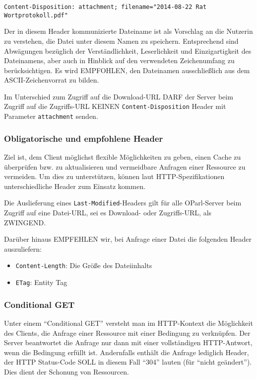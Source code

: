 \documentclass[,a4paper]{article}
\begin{document}
\begin{verbatim}
Content-Disposition: attachment; filename="2014-08-22 Rat Wortprotokoll.pdf"
\end{verbatim}

Der in diesem Header kommunizierte Dateiname ist als Vorschlag an die
Nutzerin zu verstehen, die Datei unter diesem Namen zu speichern.
Entsprechend sind Abwägungen bezüglich der Verständlichkeit,
Leserlichkeit und Einzigartigkeit des Dateinamens, aber auch in Hinblick
auf den verwendeten Zeichenumfang zu berücksichtigen. Es wird EMPFOHLEN,
den Dateinamen ausschließlich aus dem ASCII-Zeichenvorrat zu bilden.

Im Unterschied zum Zugriff auf die Download-URL DARF der Server beim
Zugriff auf die Zugriffs-URL KEINEN \texttt{Content-Disposition} Header
mit Parameter \texttt{attachment} senden.

\subsubsection{Obligatorische und empfohlene
Header}\label{obligatorische-und-empfohlene-header}

Ziel ist, dem Client möglichst flexible Möglichkeiten zu geben, einen
Cache zu überprüfen bzw. zu aktualisieren und vermeidbare Anfragen einer
Ressource zu vermeiden. Um dies zu unterstützen, können laut
HTTP-Spezifikationen unterschiedliche Header zum Einsatz kommen.

Die Auslieferung eines \texttt{Last-Modified}-Headers gilt für alle
OParl-Server beim Zugriff auf eine Datei-URL, sei es Download- oder
Zugriffs-URL, als ZWINGEND.

Darüber hinaus EMPFEHLEN wir, bei Anfrage einer Datei die folgenden
Header auszuliefern:

\begin{itemize}
\itemsep1pt\parskip0pt
\item
  \texttt{Content-Length}: Die Größe des Dateiinhalts
\item
  \texttt{ETag}: Entity Tag
\end{itemize}

\subsubsection{Conditional GET}\label{conditional-get}

Unter einem ``Conditional GET'' versteht man im HTTP-Kontext die
Möglichkeit des Clients, die Anfrage einer Ressource mit einer Bedingung
zu verknüpfen. Der Server beantwortet die Anfrage nur dann mit einer
vollständigen HTTP-Antwort, wenn die Bedingung erfüllt ist. Andernfalls
enthält die Anfrage lediglich Header, der HTTP Status-Code SOLL in
diesem Fall ``304'' lauten (für ``nicht geändert''). Dies dient der
Schonung von Ressourcen.
\end{document}
